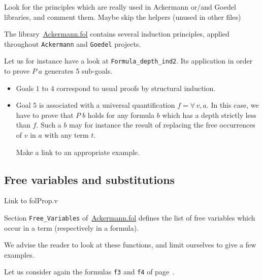 
\begin{todo}
 Look for the principles which are really used in Ackermann or/and Goedel libraries, and comment them.
 Maybe skip the helpers (unused in other files)
\end{todo}

The library~\href{../theories/html/hydras.Ackermann.fol.html}{Ackermann.fol} contains several induction principles, applied 
throughout \texttt{Ackermann} and \texttt{Goedel} projects.


Let us for instance have a look  at \texttt{Formula\_depth\_ind2}. Its application in order to prove $P\;a$ generates 5 sub-goals. 


\begin{itemize}
\item Goals $1$ to $4$ correspond to  usual proofs by structural induction.
\item Goal $5$ is associated with a universal quantification $f=\forall\,v,a$. In this case, we have to prove that $P\;b$ holds for any formula $b$ which has a depth strictly less than $f$. Such a $b$ may for instance the result of replacing the free occurrences of $v$ in $a$ with any term $t$.
  \begin{todo}
   Make a link to an appropriate example.
  \end{todo}
\end{itemize}



\subsection{Free variables and substitutions}

\begin{todo}
Link to folProp.v
\end{todo}


 
Section \texttt{Free\_Variables} 
of~\href{../theories/html/hydras.Ackermann.fol.html}{Ackermann.fol} defines the list of free variables which occur in a term (respectively in a formula).

We advise the reader to look at these functions, and limit ourselves to give a few examples.

Let us consider again the formulas \texttt{f3} and \texttt{f4} of page~\pageref{fol:examplesf1f2f3}.

